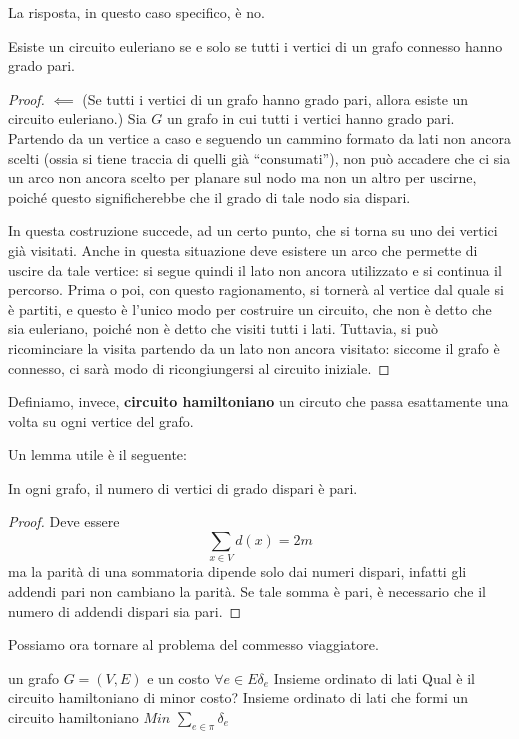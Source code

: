 La risposta, in questo caso specifico, è no.
\begin{theorem}\label{thm:circ_euleriano}
	Esiste un circuito euleriano se e solo se tutti i vertici di un
	grafo connesso hanno grado pari.
\end{theorem}

\begin{proof}
	$\impliedby$ (Se tutti i vertici di un grafo hanno grado pari, allora esiste un
	circuito euleriano.) Sia $G$ un grafo in cui tutti i vertici hanno grado  pari.
	Partendo da un vertice a caso e seguendo un cammino formato da lati non
	ancora scelti (ossia si tiene traccia di quelli già ``consumati''), non può
	accadere che ci sia un arco non ancora scelto per planare sul nodo ma non
	un altro per uscirne, poiché questo significherebbe che il grado di tale nodo
	sia dispari.

	In questa costruzione succede, ad un certo punto, che si torna su uno
	dei vertici già visitati. Anche in questa situazione deve esistere un arco
	che permette di uscire da tale vertice: si segue quindi il lato non ancora
	utilizzato e si continua il percorso. Prima o poi, con questo ragionamento,
	si tornerà al vertice dal quale si è partiti, e questo è l'unico modo
	per costruire un circuito, che non è detto che sia euleriano, poiché non
	è detto che visiti tutti i lati. Tuttavia, si può ricominciare la visita partendo
	da un lato non ancora visitato: siccome il grafo è connesso, ci sarà modo
	di ricongiungersi al circuito iniziale.

\end{proof}

\noindent
Definiamo, invece, \textbf{circuito hamiltoniano} un circuto che passa esattamente una volta su ogni
vertice del grafo.

Un lemma utile è il seguente:
\begin{lemma}\label{lem:handshaking}
	In ogni grafo, il numero di vertici di grado dispari è pari.
\end{lemma}
\begin{proof}
	Deve essere
	$$
		\sum_{x \in V} d(x) = 2m
	$$
	ma la parità di una sommatoria dipende solo dai numeri dispari, infatti gli
	addendi pari non cambiano la parità. Se tale somma è pari, è necessario
	che il numero di addendi dispari sia pari.
\end{proof}


\noindent
Possiamo ora tornare al problema del commesso viaggiatore.

 {un grafo $G = (V,E)$ e un costo $\forall e \in E \delta_e$}
{Insieme ordinato di lati}
{Qual è il circuito hamiltoniano di minor costo?}
{Insieme ordinato di lati che formi un circuito hamiltoniano}
{$Min$}
{$\sum_{e \in \pi} \delta_e$}

